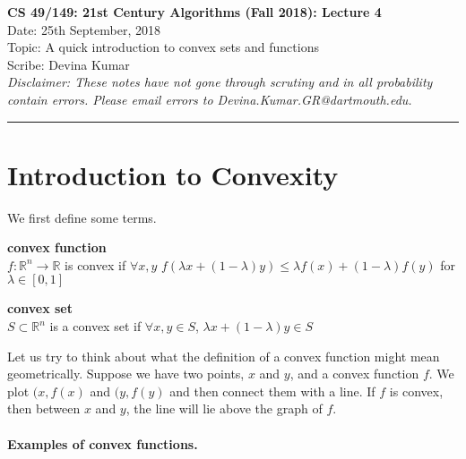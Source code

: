 \documentclass[11pt]{article}
\begin{document}
	\begin{center}
		{\bf \Large CS 49/149: 21st Century Algorithms (Fall 2018): Lecture 4}\\ 
		Date: 25th September, 2018 \\
		Topic: A quick introduction to convex sets and functions \\
		Scribe: Devina Kumar \\
		{\em Disclaimer: These notes have not gone through scrutiny and in all probability contain errors. Please email errors to Devina.Kumar.GR@dartmouth.edu.}
	\end{center}
\hrule height 2pt
\vspace{3ex}
\def\loss{\mathsf{loss}}
\section{Introduction to Convexity}
We first define some terms.
\begin{list}{•}
\item \textbf{convex function}\\
$f: \mathbb{R}^{n} \longrightarrow \mathbb{R}$ is convex if $\forall x, y$ $f(\lambda x + (1-\lambda)y) \leq \lambda f(x) + (1-\lambda)f(y)$ for $\lambda \in [0,1]$
\item \textbf{convex set}\\
$S \subset \mathbb{R}^{n}$ is a convex set if $\forall x, y \in S$, $\lambda x + (1-\lambda)y \in S$\\
\end{list}
Let us try to think about what the definition of a convex function might mean geometrically.  Suppose we have two points, $x$ and $y$, and a convex function $f$.  We plot $(x, f(x)$ and $(y, f(y)$ and then connect them with a line.  If $f$ is convex, then between $x$ and $y$, the line will lie above the graph of $f$.
\smallskip
\paragraph{Examples of convex functions.}
\end{document}
